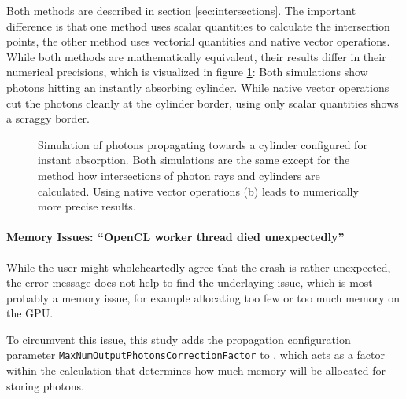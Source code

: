 Both methods are described in section \ref{sec:intersections}. The
important difference is that one method uses scalar quantities to
calculate the intersection points, the other method uses vectorial
quantities and native vector operations. While both methods are
mathematically equivalent, their results differ in their numerical
precisions, which is visualized in figure \ref{fig:usie5Ohj}: Both
simulations show photons hitting an instantly absorbing cylinder. While
native vector operations cut the photons cleanly at the cylinder border,
using only scalar quantities shows a scraggy border.

\begin{figure}[htbp]
  \hfill
  \hfill
  \caption{Simulation of photons propagating towards a cylinder configured for instant absorption. Both simulations are the same except for the method how intersections of photon rays and cylinders are calculated. Using native vector operations (b) leads to numerically more precise results.}
  \label{fig:usie5Ohj}
\end{figure}


\paragraph{Memory Issues: ``OpenCL worker thread died unexpectedly''}

While the user might wholeheartedly agree that the crash is rather
unexpected, the error message does not help to find the underlaying
issue, which is most probably a memory issue, for example allocating too
few or too much memory on the GPU.

To circumvent this issue, this study adds the propagation configuration
parameter \texttt{MaxNumOutputPhotonsCorrectionFactor} to \clsim, which
acts as a factor within the calculation that determines how much memory
will be allocated for storing photons.

